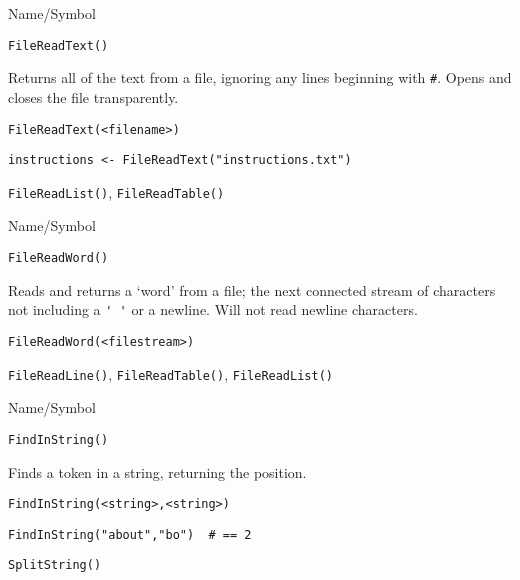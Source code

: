 \begin{desc}{Name/Symbol}
\item[Name/Symbol]	\verb+FileReadText()+

\item[Description]	Returns all of the text from a file, ignoring any lines
		beginning with \verb+#+. Opens and closes the file transparently.

\item[Usage]
\begin{verbatim}
FileReadText(<filename>)
\end{verbatim}

\item[Example]
\begin{verbatim}
instructions <- FileReadText("instructions.txt")
\end{verbatim}

\item[See Also]	\verb+FileReadList()+, \verb+FileReadTable()+
\end{desc}

\rl



\begin{desc}{Name/Symbol}
\item[Name/Symbol]	\verb+FileReadWord()+

\item[Description]	Reads and returns  a `word' from a file; the next
		connected stream of characters not including a \verb+' '+
		or a newline. Will not read newline characters.

\item[Usage]
\begin{verbatim}
FileReadWord(<filestream>)
\end{verbatim}

\item[Example]	

\item[See Also]	\verb+FileReadLine()+, \verb+FileReadTable()+, \verb+FileReadList()+
\end{desc}

\rl




\begin{desc}{Name/Symbol}
\item[Name/Symbol]	\verb+FindInString()+

\item[Description]	Finds a token in a string, returning the position.

\item[Usage]
\begin{verbatim}
FindInString(<string>,<string>)
\end{verbatim}

\item[Example]
\begin{verbatim}
FindInString("about","bo") 	# == 2
\end{verbatim}

\item[See Also]	\verb+SplitString()+
\end{desc}


